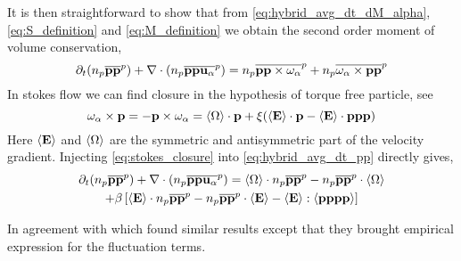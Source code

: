 It is then straightforward to show that from \ref{eq:hybrid_avg_dt_dM_alpha},\ref{eq:S_definition} and \ref{eq:M_definition} we obtain the second order moment of volume conservation,
\begin{equation}
    \partial_t (n_p\overline{\textbf{pp}}^{p})
    + \mathbf{\nabla} \cdot (
        n_p\overline{\textbf{pp}\textbf{u}_\alpha}^{p}
        )
    = 
    n_p\overline{\textbf{pp} \times \omega_\alpha}^{p}
    + n_p\overline{\omega_\alpha \times \textbf{pp}}^{p} 
    \label{eq:hybrid_avg_dt_pp}
\end{equation}
In stokes flow we can find closure in the hypothesis of torque free particle, see \citet{kim2013microhydrodynamics}
\begin{equation}
    \omega_\alpha \times \textbf{p} 
    = -  \textbf{p} \times \omega_\alpha 
    = \left<\Omega\right> \cdot \textbf{p} + \xi(\left<\textbf{E}\right> \cdot \textbf{p} - \left<\textbf{E}\right> \cdot \textbf{ppp})
    \label{eq:stokes_closure}
\end{equation}
Here $\left<\textbf{E}\right>$ and $\left<\Omega\right>$ are the symmetric and antisymmetric part of the velocity gradient. 
Injecting \ref{eq:stokes_closure} into \ref{eq:hybrid_avg_dt_pp} directly gives,
\begin{multline}
    \partial_t (n_p\overline{\textbf{pp}}^{p})
    + \mathbf{\nabla} \cdot (
        n_p\overline{\textbf{pp}\textbf{u}_\alpha}^{p}
        )
    = 
    \left<\Omega\right> \cdot n_p\overline{\textbf{pp}}^{p} 
    - n_p\overline{\textbf{pp}}^{p} \cdot \left<\Omega\right> \\
    + \beta\left[
        \left<\textbf{E}\right> \cdot n_p\overline{\textbf{pp}}^{p} 
        -n_p\overline{\textbf{pp}}^{p} \cdot \left<\textbf{E}\right> 
    - \left<\textbf{E}\right> : \left<\textbf{pppp}\right>
    \right]
\end{multline}

In agreement with \citet{advani1987use} which found similar results except that they brought empirical expression for the fluctuation terms. 

